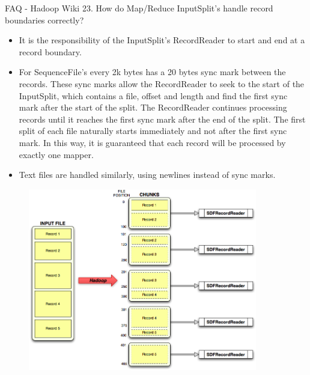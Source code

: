 \documentclass{beamer}
\begin{document}
\begin{frame}{FAQ - Hadoop Wiki}
    \alert{23. How do Map/Reduce InputSplit's handle record boundaries correctly? } 
    \begin{itemize}
    \item It is the responsibility of the InputSplit's RecordReader to start and end at a record boundary. 
    \item For SequenceFile's every 2k bytes has a 20 bytes sync mark between the records.
        These sync marks allow the RecordReader to seek to the start of the InputSplit, which contains a file, offset and length and find the first sync mark after the start of the split.
        The RecordReader continues processing records until it reaches the first sync mark after the end of the split.
        The first split of each file naturally starts immediately and not after the first sync mark.
        In this way, it is guaranteed that each record will be processed by exactly one mapper. 
    \item Text files are handled similarly, using newlines instead of sync marks. 
    \end{itemize}
\end{frame}

\begin{frame}{}
    \begin{figure}
    \includegraphics[width=100mm]{hadoop-chunking}
    \end{figure}
\end{frame}
\end{document}
